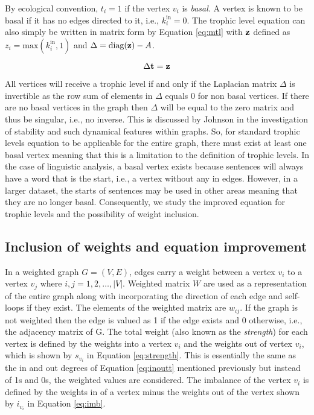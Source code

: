 By ecological convention, $t_i = 1$ if the vertex $v_i$ is \emph{basal}. A vertex is known to be basal if it has no edges directed to it, i.e., $k_i^{\text{in}} = 0$. The trophic level equation can also simply be written in matrix form by Equation \ref{eq:mtl} with $\bold{z}$ defined as $z_i = \text{max}(k_i^{\text{in}},1)$ and $\Delta = \text{diag}(\bold{z}) - A$.

\begin{equation} \label{eq:mtl}
\Delta\bold{t} = \bold{z} 
\end{equation}

All vertices will receive a trophic level if and only if the Laplacian matrix $\Delta$ is invertible as the row sum of elements in $\Delta$ equals 0 for non basal vertices. If there are no basal vertices in the graph then $\Delta$ will be equal to the zero matrix and thus be singular, i.e., no inverse. This is discussed by Johnson \cite{johnson2020digraphs} in the investigation of stability and such dynamical features within graphs. So, for standard trophic levels equation to be applicable for the entire graph, there must exist at least one basal vertex meaning that this is a limitation to the definition of trophic levels. In the case of linguistic analysis, a basal vertex exists because sentences will always have a word that is the start, i.e., a vertex without any in edges. However, in a larger dataset, the starts of sentences may be used in other areas meaning that they are no longer basal. Consequently, we study the improved equation for trophic levels and the possibility of weight inclusion. 

\subsection{Inclusion of weights and equation improvement}
In a weighted graph $G = (V, E)$, edges carry a weight between a vertex $v_i$ to a vertex $v_j$ where $i , j = 1 , 2, \dots , \lvert V \rvert$. Weighted matrix $W$ are used as a representation of the entire graph along with incorporating the direction of each edge and self-loops if they exist. The elements of the weighted matrix are $w_{ij}$. If the graph is not weighted then the edge is valued as 1 if the edge exists and 0 otherwise, i.e., the adjacency matrix of G. The total weight (also known as the \emph{strength}) for each vertex is defined by the weights into a vertex $v_i$ and the weights out of vertex $v_i$, which is shown by $s_{v_i}$ in Equation \ref{eq:strength}. This is essentially the same as the in and out degrees of Equation \ref{eq:inoutt} mentioned previously but instead of 1s and 0s, the weighted values are considered. The imbalance of the vertex $v_i$ is defined by the weights in of a vertex minus the weights out of the vertex shown by $i_{v_i}$ in Equation \ref{eq:imb}.


